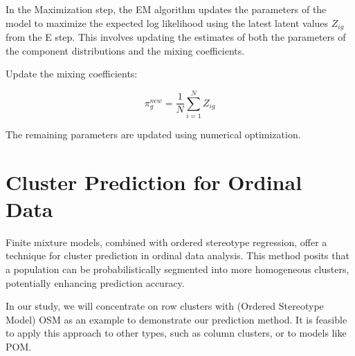 \documentclass{article}
\begin{document}
In the Maximization step, the EM algorithm updates the parameters of the model to maximize the expected log likelihood using the latest latent values $Z_{ig}$ from the E step. 
This involves updating the estimates of both the parameters of the component distributions and the mixing coefficients.

Update the mixing coefficients:

\begin{equation}
\pi_g^{new} = \frac{1}{N} \sum_{i=1}^{N} Z_{ig}
\end{equation}

The remaining parameters are updated using numerical optimization.








\section{Cluster Prediction for Ordinal Data}

Finite mixture models, combined with ordered stereotype regression, offer a technique for cluster prediction in ordinal data analysis. This method posits that a population can be probabilistically segmented into more homogeneous clusters, potentially enhancing prediction accuracy.

In our study, we will concentrate on row clusters with (Ordered Stereotype Model) OSM as an example to demonstrate our prediction method. It is feasible to apply this approach to other types, such as column clusters, or to models like POM.
\end{document}
